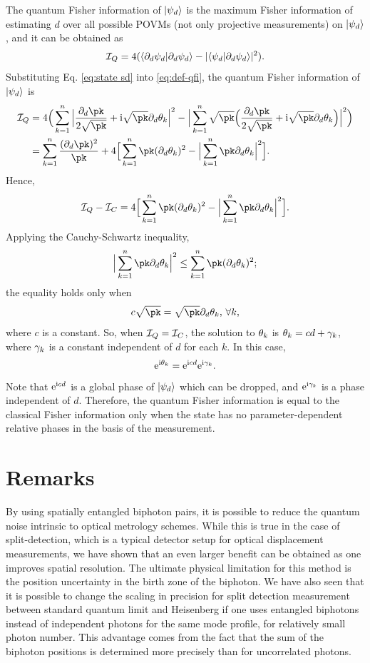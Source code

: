 The quantum Fisher information of $|\psi_{d}\rangle$ is the maximum Fisher information
of estimating $d$ over all possible POVMs (not only projective measurements)
on $|\psi_{d}\rangle$, and it can be obtained as
\begin{equation}
\mathcal{I}_{Q}=4(\langle\partial_{d}\psi_{d}|\partial_{d}\psi_{d}\rangle-|\langle\psi_{d}|\partial_{d}\psi_{d}\rangle|^{2}).\label{eq:def-qfi}
\end{equation}
Substituting Eq. \eqref{eq:state sd} into \eqref{eq:def-qfi}, the quantum
Fisher information of $|\psi_{d}\rangle$ is
\begin{equation}
\begin{aligned}\iq & =4\Big(\sk\Big|\frac{\pd\pk}{2\sqrt{\pk}}+\i\sqrt{\pk}\pd\tk\Big|^{2}-\Big|\sk\sqrt{\pk}\Big(\frac{\pd\pk}{2\sqrt{\pk}}+\i\sqrt{\pk}\pd\tk\Big)\Big|^{2}\Big)\\
 & =\sk\frac{(\pd\pk)^{2}}{\pk}+4\Big[\sk\pk(\pd\tk)^{2}-\Big|\sk\pk\pd\tk\Big|^{2}\Big].
\end{aligned}
\end{equation}
Hence,
\begin{equation}
\iq-\ic=4\Big[\sk\pk(\pd\tk)^{2}-\Big|\sk\pk\pd\tk\Big|^{2}\Big].
\end{equation}
Applying the Cauchy-Schwartz inequality,
\begin{equation}
\Big|\sk\pk\pd\tk\Big|^{2}\leq\sk\pk(\pd\tk)^{2};
\end{equation}
the equality holds only when
\begin{equation}
c\sqrt{\pk}=\sqrt{\pk}\pd\tk,\,\forall k,
\end{equation}
where $c$ is a constant. So, when $\mathcal{I}_{Q}=\mathcal{I}_{C}$, the solution to $\theta_{k}$ is $\theta_{k}=cd+\gamma_{k}$,
where $\gamma_{k}$ is a constant independent of $d$ for each $k$. In this case,
\begin{equation}
{\rm e}^{{\rm i}\theta_{k}}={\rm e}^{{\rm i} cd}{\rm e}^{{\rm i}\gamma_{k}}.
\end{equation}
Note that ${\rm e}^{{\rm i} cd}$ is a global phase of $|\psi_{d}\rangle$ which can be dropped,
and ${\rm e}^{{\rm i}\gamma_{k}}$ is a phase independent of $d$. Therefore, the quantum
Fisher information is equal to the classical Fisher information only when the state has no parameter-dependent
relative phases in the basis of the measurement.


\section{Remarks}\label{sec:conclusion}
By using spatially entangled biphoton pairs, it is possible to reduce the quantum noise intrinsic to optical metrology schemes.  
While this is true in the case of split-detection, which is a typical detector setup for optical displacement measurements, we have shown that an even larger benefit can be obtained as one improves spatial resolution.   The ultimate physical limitation for this method is the position uncertainty in the birth zone of the biphoton.  We have also seen that it is possible to change the scaling in precision for split detection measurement between standard quantum limit and Heisenberg if one uses entangled biphotons instead of independent photons for the same mode profile, for relatively small photon number.  
This advantage comes from the fact that the sum of the biphoton positions is determined more precisely than for uncorrelated photons.

